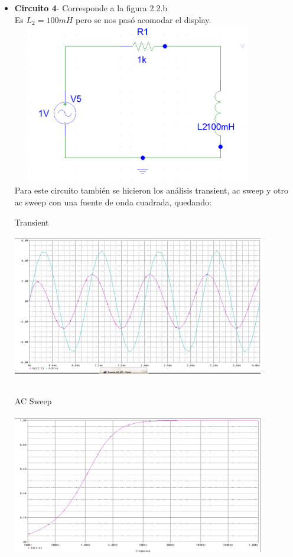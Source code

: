 \documentclass[12pt]{article}
\begin{document}
\begin{itemize}
		\item \textbf{Circuito 4}- Corresponde a la figura 2.2.b\\ 
		
		\noindent Es $L_2 = 100mH$ pero se nos pasó acomodar el display.\\
		
		\includegraphics[width=11cm,height=7cm]{Img/ac_rl}\\
		
		\noindent Para este circuito también se hicieron los análisis transient, ac sweep y otro ac sweep con una fuente de onda cuadrada, quedando:
		
		\newpage
		
		\noindent Transient\\
		
		\includegraphics[width=11cm,height=7cm]{Img/Fuente_AC_RL}
		
		\noindent AC Sweep\\
		
		\includegraphics[width=11cm,height=7cm]{Img/Fuente_AC_RL_AC_sweep}
		

\end{itemize}
\end{document}
